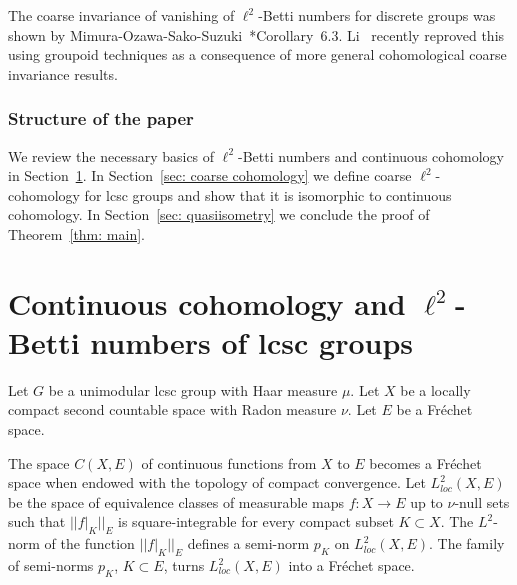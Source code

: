 \documentclass[10pt]{amsart}
\theoremstyle{plain}
\theoremstyle{definition}
\theoremstyle{remark}
\begin{document}
The coarse invariance of vanishing of $\ell^2$-Betti numbers for discrete groups was shown by Mimura-Ozawa-Sako-Suzuki~\cite{taka}*{Corollary~6.3}. 
Li~\cite{li} recently reproved this using groupoid techniques as a consequence of more general cohomological coarse invariance results. 

\subsubsection*{Structure of the paper} We review the necessary basics of $\ell^2$-Betti numbers and continuous cohomology in Section~\ref{sec: continuous cohomology}. 
In Section~\ref{sec: coarse cohomology} we define coarse $\ell^2$-cohomology for lcsc groups and show that it is isomorphic to continuous cohomology. In Section~\ref{sec: quasiisometry} we conclude the proof of Theorem~\ref{thm: main}.

\section{Continuous cohomology and $\ell^2$-Betti numbers of lcsc groups}\label{sec: continuous cohomology}

Let $G$ be a unimodular lcsc group with Haar measure $\mu$. 
Let $X$ be a locally compact second countable space with Radon measure $\nu$. Let $E$ be a Fr\'{e}chet space. 

The space $C(X, E)$ of continuous functions from $X$ to $E$ becomes 
a Fr\'{e}chet space when endowed with the topology of compact convergence. 
Let ${L^2_{loc}}(X, E)$ be the space of 
equivalence classes of measurable maps $f\colon X\to E$ up to $\nu$-null sets such that $||f\vert_K||_E$ 
is square-integrable for every compact subset $K\subset X$. The $L^2$-norm of the function $||f\vert_K||_E$ defines a semi-norm $p_K$ on ${L^2_{loc}}(X, E)$. The family of semi-norms $p_K$, $K\subset E$, turns 
${L^2_{loc}}(X, E)$ into a Fr\'{e}chet space. 
\end{document}
